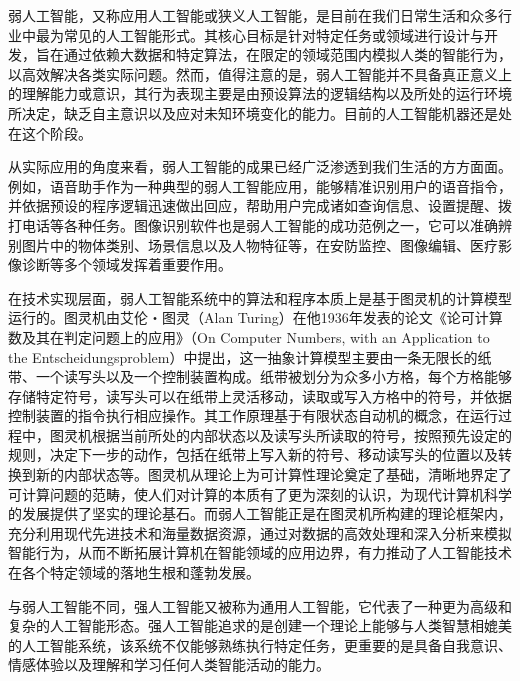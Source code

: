 弱人工智能，又称应用人工智能或狭义人工智能，是目前在我们日常生活和众多行业中最为常见的人工智能形式。其核心目标是针对特定任务或领域进行设计与开发，旨在通过依赖大数据和特定算法，在限定的领域范围内模拟人类的智能行为，以高效解决各类实际问题。然而，值得注意的是，弱人工智能并不具备真正意义上的理解能力或意识，其行为表现主要是由预设算法的逻辑结构以及所处的运行环境所决定，缺乏自主意识以及应对未知环境变化的能力。目前的人工智能机器还是处在这个阶段。


从实际应用的角度来看，弱人工智能的成果已经广泛渗透到我们生活的方方面面。例如，语音助手作为一种典型的弱人工智能应用，能够精准识别用户的语音指令，并依据预设的程序逻辑迅速做出回应，帮助用户完成诸如查询信息、设置提醒、拨打电话等各种任务。图像识别软件也是弱人工智能的成功范例之一，它可以准确辨别图片中的物体类别、场景信息以及人物特征等，在安防监控、图像编辑、医疗影像诊断等多个领域发挥着重要作用。


在技术实现层面，弱人工智能系统中的算法和程序本质上是基于图灵机的计算模型运行的。图灵机由艾伦・图灵（Alan Turing）在他1936年发表的论文《论可计算数及其在判定问题上的应用》（On Computer Numbers, with an Application to the Entscheidungsproblem）中提出，这一抽象计算模型主要由一条无限长的纸带、一个读写头以及一个控制装置构成。纸带被划分为众多小方格，每个方格能够存储特定符号，读写头可以在纸带上灵活移动，读取或写入方格中的符号，并依据控制装置的指令执行相应操作。其工作原理基于有限状态自动机的概念，在运行过程中，图灵机根据当前所处的内部状态以及读写头所读取的符号，按照预先设定的规则，决定下一步的动作，包括在纸带上写入新的符号、移动读写头的位置以及转换到新的内部状态等。图灵机从理论上为可计算性理论奠定了基础，清晰地界定了可计算问题的范畴，使人们对计算的本质有了更为深刻的认识，为现代计算机科学的发展提供了坚实的理论基石。而弱人工智能正是在图灵机所构建的理论框架内，充分利用现代先进技术和海量数据资源，通过对数据的高效处理和深入分析来模拟智能行为，从而不断拓展计算机在智能领域的应用边界，有力推动了人工智能技术在各个特定领域的落地生根和蓬勃发展。



与弱人工智能不同，强人工智能又被称为通用人工智能，它代表了一种更为高级和复杂的人工智能形态。强人工智能追求的是创建一个理论上能够与人类智慧相媲美的人工智能系统，该系统不仅能够熟练执行特定任务，更重要的是具备自我意识、情感体验以及理解和学习任何人类智能活动的能力。



